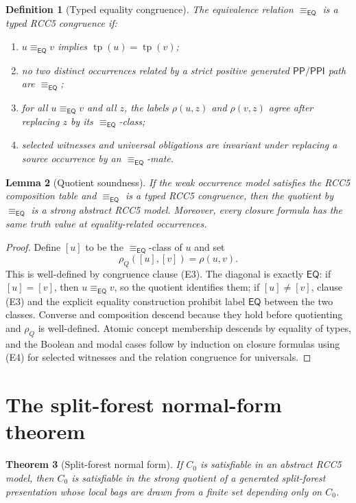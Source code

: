 \documentclass[11pt]{article}
\newtheorem{theorem}{Theorem}[section]
\newtheorem{lemma}[theorem]{Lemma}
\newtheorem{definition}[theorem]{Definition}
\newcommand{\EQ}{\mathsf{EQ}}
\newcommand{\PP}{\mathsf{PP}}
\newcommand{\PPI}{\mathsf{PPI}}
\newcommand{\tp}{\operatorname{tp}}
\begin{document}
\begin{definition}[Typed equality congruence]
The equivalence relation $\equiv_{\EQ}$ is a typed RCC5 congruence if:
\begin{enumerate}[label=(E\arabic*)]
\item $u\equiv_{\EQ}v$ implies $\tp(u)=\tp(v)$;
\item no two distinct occurrences related by a strict positive generated $\PP/\PPI$ path are $\equiv_{\EQ}$;
\item for all $u\equiv_{\EQ}v$ and all $z$, the labels $\rho(u,z)$ and $\rho(v,z)$ agree after replacing $z$ by its $\equiv_{\EQ}$-class;
\item selected witnesses and universal obligations are invariant under replacing a source occurrence by an $\equiv_{\EQ}$-mate.
\end{enumerate}
\end{definition}

\begin{lemma}[Quotient soundness]
If the weak occurrence model satisfies the RCC5 composition table and $\equiv_{\EQ}$ is a typed RCC5 congruence, then the quotient by $\equiv_{\EQ}$ is a strong abstract RCC5 model.  Moreover, every closure formula has the same truth value at equality-related occurrences.
\end{lemma}

\begin{proof}
Define $[u]$ to be the $\equiv_{\EQ}$-class of $u$ and set
\[
  \rho_Q([u],[v])=\rho(u,v).
\]
This is well-defined by congruence clause (E3).  The diagonal is exactly $\EQ$: if $[u]=[v]$, then $u\equiv_{\EQ}v$, so the quotient identifies them; if $[u]\ne[v]$, clause (E3) and the explicit equality construction prohibit label $\EQ$ between the two classes.  Converse and composition descend because they hold before quotienting and $\rho_Q$ is well-defined.  Atomic concept membership descends by equality of types, and the Boolean and modal cases follow by induction on closure formulas using (E4) for selected witnesses and the relation congruence for universals.
\end{proof}

\section{The split-forest normal-form theorem}

\begin{theorem}[Split-forest normal form]\label{thm:normalform}
If $C_0$ is satisfiable in an abstract RCC5 model, then $C_0$ is satisfiable in the strong quotient of a generated split-forest presentation whose local bags are drawn from a finite set depending only on $C_0$.
\end{theorem}
\end{document}
